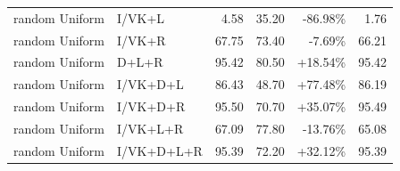 \documentclass[UTF8,10pt]{ctexart}
\newcommand{\better}[1]{\textcolor{goodblue}{#1}}
\newcommand{\worse}[1]{\textcolor{badred}{#1}}
\begin{document}
{\begin{longtable}{llrrrr}
random Uniform & I/VK+L & 4.58 & 35.20 & \worse{-86.98\%} & 1.76\\
random Uniform & I/VK+R & 67.75 & 73.40 & \worse{-7.69\%} & 66.21\\
random Uniform & D+L+R & 95.42 & 80.50 & \better{+18.54\%} & 95.42\\
random Uniform & I/VK+D+L & 86.43 & 48.70 & \better{+77.48\%} & 86.19\\
random Uniform & I/VK+D+R & 95.50 & 70.70 & \better{+35.07\%} & 95.49\\
random Uniform & I/VK+L+R & 67.09 & 77.80 & \worse{-13.76\%} & 65.08\\
random Uniform & I/VK+D+L+R & 95.39 & 72.20 & \better{+32.12\%} & 95.39\\
\bottomrule
\end{longtable}
}
\end{document}
